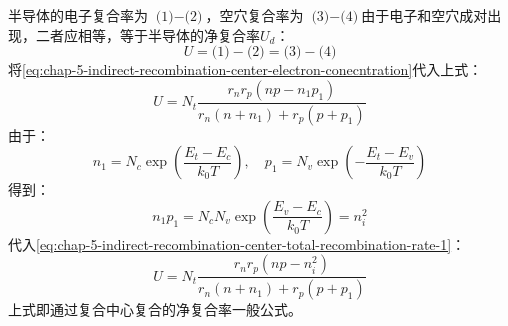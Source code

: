 半导体的电子复合率为 $\text{(1)}-\text{(2)}$，空穴复合率为 $\text{(3)}-\text{(4)}$由于电子和空穴成对出现，二者应相等，等于半导体的净复合率$U_d$：
\begin{equation}
    U=\text{(1)}-\text{(2)}=\text{(3)}-\text{(4)}
\end{equation}
将\autoref{eq:chap-5-indirect-recombination-center-electron-conecntration}代入上式：
\begin{equation}
    U=N_t\frac{r_nr_p\left(np-n_1p_1\right)}{r_n(n+n_1)+r_p(p+p_1)}\label{eq:chap-5-indirect-recombination-center-total-recombination-rate-1}
\end{equation}
由于：
\begin{equation}
    n_1=N_c\exp{\left(\frac{E_t-E_c}{k_0T}\right)},\quad p_1=N_v\exp{\left(-\frac{E_t-E_v}{k_0T}\right)}
\end{equation}
得到：
\begin{equation}
    n_1p_1=N_cN_v\exp{\left(\frac{E_v-E_c}{k_0T}\right)}=n_i^2
\end{equation}
代入\autoref{eq:chap-5-indirect-recombination-center-total-recombination-rate-1}：
\begin{equation}
    U=N_t\frac{r_nr_p\left(np-n_i^2\right)}{r_n(n+n_1)+r_p(p+p_1)}\label{eq:chap-5-indirect-recombination-center-charge-carrier-total-recombination-rate}
\end{equation}
上式即通过复合中心复合的净复合率一般公式。





